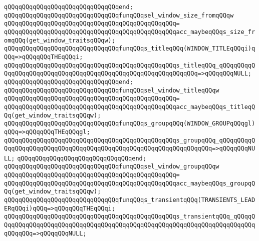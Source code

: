 \verb|qQQqqQQqqQQqqQQqqQQqqQQqqQQqqQQqend;|\newline
\newline
\verb|qQQqqQQqqQQqqQQqqQQqqQQqqQQqqQQqfunqQQqsel_window_size_fromqQQqw|\newline
\verb|qQQqqQQqqQQqqQQqqQQqqQQqqQQqqQQqqQQqqQQqqQQqqQQq=|\newline
\verb|qQQqqQQqqQQqqQQqqQQqqQQqqQQqqQQqqQQqqQQqqQQqqQQqacc_maybeqQQqs_size_fromqQQq(get_window_traitsqQQqw);|\newline
\newline
\verb|qQQqqQQqqQQqqQQqqQQqqQQqqQQqqQQqfunqQQqs_titleqQQq(WINDOW_TITLEqQQqi)qQQq=>qQQqqQQqTHEqQQqi;|\newline
\verb|qQQqqQQqqQQqqQQqqQQqqQQqqQQqqQQqqQQqqQQqqQQqqQQqs_titleqQQq_qQQqqQQqqQQqqQQqqQQqqQQqqQQqqQQqqQQqqQQqqQQqqQQqqQQqqQQqqQQqqQQq=>qQQqqQQqNULL;|\newline
\verb|qQQqqQQqqQQqqQQqqQQqqQQqqQQqqQQqend;|\newline
\newline
\verb|qQQqqQQqqQQqqQQqqQQqqQQqqQQqqQQqfunqQQqsel_window_titleqQQqw|\newline
\verb|qQQqqQQqqQQqqQQqqQQqqQQqqQQqqQQqqQQqqQQqqQQqqQQq=|\newline
\verb|qQQqqQQqqQQqqQQqqQQqqQQqqQQqqQQqqQQqqQQqqQQqqQQqacc_maybeqQQqs_titleqQQq(get_window_traitsqQQqw);|\newline
\newline
\verb|qQQqqQQqqQQqqQQqqQQqqQQqqQQqqQQqfunqQQqs_groupqQQq(WINDOW_GROUPqQQqgl)qQQq=>qQQqqQQqTHEqQQqgl;|\newline
\verb|qQQqqQQqqQQqqQQqqQQqqQQqqQQqqQQqqQQqqQQqqQQqqQQqs_groupqQQq_qQQqqQQqqQQqqQQqqQQqqQQqqQQqqQQqqQQqqQQqqQQqqQQqqQQqqQQqqQQqqQQqqQQq=>qQQqqQQqNULL;|\newline
\verb|qQQqqQQqqQQqqQQqqQQqqQQqqQQqqQQqend;|\newline
\newline
\verb|qQQqqQQqqQQqqQQqqQQqqQQqqQQqqQQqfunqQQqsel_window_groupqQQqw|\newline
\verb|qQQqqQQqqQQqqQQqqQQqqQQqqQQqqQQqqQQqqQQqqQQqqQQq=|\newline
\verb|qQQqqQQqqQQqqQQqqQQqqQQqqQQqqQQqqQQqqQQqqQQqqQQqacc_maybeqQQqs_groupqQQq(get_window_traitsqQQqw);|\newline
\newline
\verb|qQQqqQQqqQQqqQQqqQQqqQQqqQQqqQQqfunqQQqs_transientqQQq(TRANSIENTS_LEADERqQQqi)qQQq=>qQQqqQQqTHEqQQqi;|\newline
\verb|qQQqqQQqqQQqqQQqqQQqqQQqqQQqqQQqqQQqqQQqqQQqqQQqs_transientqQQq_qQQqqQQqqQQqqQQqqQQqqQQqqQQqqQQqqQQqqQQqqQQqqQQqqQQqqQQqqQQqqQQqqQQqqQQqqQQqqQQqqQQq=>qQQqqQQqNULL;|\newline
